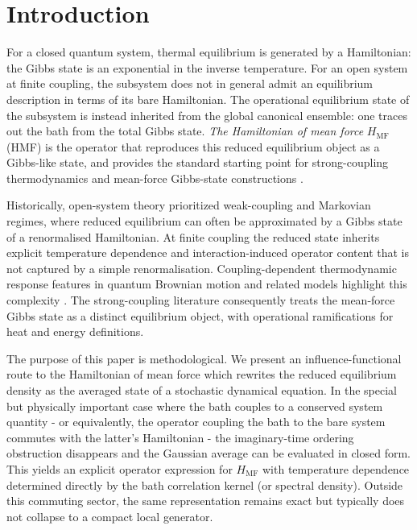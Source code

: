 \section{\label{sec:intro}Introduction}

For a closed quantum system, thermal equilibrium is generated by a Hamiltonian:
the Gibbs state is an exponential in the inverse temperature. For an open system
at finite coupling, the subsystem does not in general admit an equilibrium
description in terms of its bare Hamiltonian. The operational equilibrium state
of the subsystem is instead inherited from the global canonical ensemble: one
traces out the bath from the total Gibbs state. \emph{The Hamiltonian of mean force} $H_{\mathrm{MF}}$
(HMF) is the operator that reproduces this reduced equilibrium object as a
Gibbs-like state, and provides the standard starting point for strong-coupling
thermodynamics and mean-force Gibbs-state constructions
\cite{campisiFluctuationTheoremArbitrary2009,talknerColloquiumStatisticalMechanics2020,trushechkinOpenQuantumSystem2022,seifertFirstSecondLaw2016}.

Historically, open-system theory prioritized weak-coupling and Markovian
regimes, where reduced equilibrium can often be approximated by a Gibbs state of a renormalised Hamiltonian. At finite coupling the reduced state inherits explicit
temperature dependence and interaction-induced operator content that is not
captured by a simple renormalisation. Coupling-dependent thermodynamic response
features in quantum Brownian motion and related models highlight this
complexity \cite{hanggiFiniteQuantumDissipation2008,ingoldSpecificHeatAnomalies2009}.
The strong-coupling literature consequently treats the mean-force Gibbs state as
a distinct equilibrium object, with operational ramifications for heat and
energy definitions\cite{espositoNatureHeatStrongly2015,rivasStrongCouplingThermodynamics2020}.

The purpose of this paper is methodological. We present an influence-functional
route to the Hamiltonian of mean force which rewrites the reduced equilibrium density as the averaged state of a stochastic dynamical equation. In the special but physically important
case where the bath couples to a conserved system quantity - or equivalently, the
operator coupling the bath to the bare system commutes with the latter's Hamiltonian - the imaginary-time ordering obstruction disappears and the Gaussian average can be evaluated in
closed form. This yields an explicit operator expression for $H_{\mathrm{MF}}$
with temperature dependence determined directly by the bath correlation kernel
(or spectral density). Outside this commuting sector, the same representation
remains exact but typically does not collapse to a compact local generator.

